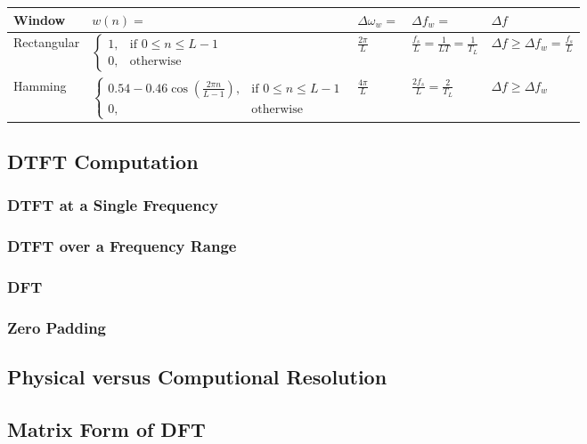 \begin{tabularx}{\textwidth}{|l|l|l|l|X|}
	\hline
	\textbf{Window} & $w(n) = $ & $\Delta\omega_w =$ & $\Delta f_w = $ & $\Delta f$
	\\ \hline
	Rectangular &
	$ \begin{cases}
			1, & \text{if } 0 \leq n \leq L-1 \\
			0, & \text{otherwise}
	  \end{cases}$ &
	$ \frac{2\pi}{L}$ &
	$ \frac{f_s}{L} = \frac{1}{LT} = \frac{1}{T_L}$ &
	$ \Delta f \geq \Delta f_w = \frac{f_s}{L}$
	\\ \hline
	Hamming &
	$ \begin{cases}
		0.54 - 0.46 \cos(\frac{2\pi n}{L-1}), & \text{if } 0 \leq n \leq L-1 \\
		0, & \text{otherwise}
	  \end{cases}$ &
	$\frac{4\pi}{L}$ &
	$\frac{2f_s}{L} = \frac{2}{T_L} $ &
	$\Delta f \geq \Delta f_w $
	\\ \hline
\end{tabularx}

\subsection{DTFT Computation}
\subsubsection{DTFT at a Single Frequency}
\subsubsection{DTFT over a Frequency Range}
\subsubsection{DFT}
\subsubsection{Zero Padding}

\subsection{Physical versus Computional Resolution}

\subsection{Matrix Form of DFT}

